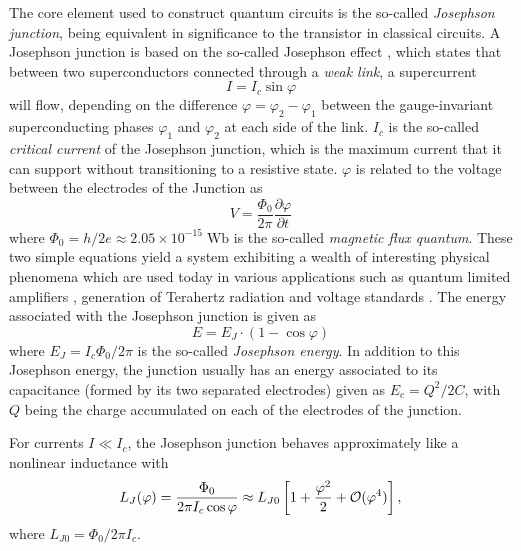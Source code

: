 The core element used to construct quantum circuits is the so-called {\it Josephson junction}, being equivalent in significance to the transistor in classical circuits. A Josephson junction is based on the so-called Josephson effect \citep{josephson_possible_1962}, which states that between two superconductors connected through a {\it weak link}, a supercurrent
%
\begin{equation}
I = I_c\sin{\varphi}
\end{equation}
%
will flow, depending on the difference $\varphi = \varphi_2-\varphi_1$ between the gauge-invariant superconducting phases $\varphi_1$ and $\varphi_2$ at each side of the link. $I_c$ is the so-called {\it critical current} of the Josephson junction, which is the maximum current that it can support without transitioning to a resistive state. $\varphi$ is related to the voltage between the electrodes of the Junction as
%
\begin{equation}
V = \frac{\Phi_0}{2\pi}\frac{\partial \varphi}{\partial t}
\end{equation}
%
where $\Phi_0 =h/2e \approx 2.05\times 10^{-15}\;\mathrm{Wb}$ is the so-called {\it magnetic flux quantum}. These two simple equations yield a system exhibiting a  wealth of interesting physical phenomena which are used today in various applications such as quantum limited amplifiers \citep{vijay_invited_2009}, generation of Terahertz radiation \citep{ozyuzer_emission_2007} and voltage standards \citep{levinsen_inverse_1977}. The energy associated with the Josephson junction is given as
%
\begin{equation}
E = E_J\cdot(1-\cos{\varphi})
\end{equation}
%
where $E_J = I_c \Phi_0/2\pi$ is the so-called {\it Josephson energy}. In addition to this Josephson energy, the junction usually has an energy associated to its capacitance (formed by its two separated electrodes) given as $E_c = Q^2/2C$, with $Q$ being the charge accumulated on each of the electrodes of the junction.

\smallskip

For currents $I\ll I_c$, the Josephson junction behaves approximately like a nonlinear inductance with
%
\begin{equation}
L_J(\varphi) = \frac{\Phi_0}{2\pi I_c \cos{\varphi}} \approx L_{J0}\left[1+\frac{\varphi^2}{2}+\begin{mathcal}O\end{mathcal}(\varphi^4)\right],\label{eq:josephson_inductance}
\end{equation}
%
where $L_{J0}=\Phi_0/2\pi I_c$. 

